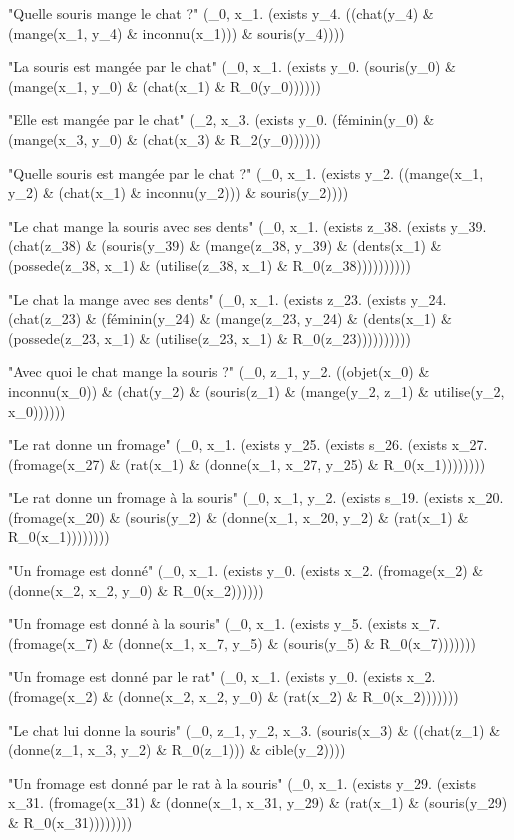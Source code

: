 \documentclass[12pt]{article}
\theoremstyle{exostyle}
\begin{document}
\begin{spverbatim}
"Quelle souris mange le chat ?"
 (\y_0, x_1. (exists y_4. ((chat(y_4) & (mange(x_1, y_4) & inconnu(x_1))) & souris(y_4))))

"La souris est mangée par le chat"
 (\R_0, x_1. (exists y_0. (souris(y_0) & (mange(x_1, y_0) & (chat(x_1) & R_0(y_0))))))

"Elle est mangée par le chat"
 (\R_2, x_3. (exists y_0. (féminin(y_0) & (mange(x_3, y_0) & (chat(x_3) & R_2(y_0))))))

"Quelle souris est mangée par le chat ?"
 (\y_0, x_1. (exists y_2. ((mange(x_1, y_2) & (chat(x_1) & inconnu(y_2))) & souris(y_2))))

"Le chat mange la souris avec ses dents"
 (\R_0, x_1. (exists z_38. (exists y_39. (chat(z_38) & (souris(y_39) & (mange(z_38, y_39) & (dents(x_1) & (possede(z_38, x_1) & (utilise(z_38, x_1) & R_0(z_38))))))))))

"Le chat la mange avec ses dents"
 (\R_0, x_1. (exists z_23. (exists y_24. (chat(z_23) & (féminin(y_24) & (mange(z_23, y_24) & (dents(x_1) & (possede(z_23, x_1) & (utilise(z_23, x_1) & R_0(z_23))))))))))

"Avec quoi le chat mange la souris ?"
 (\x_0, z_1, y_2. ((objet(x_0) & inconnu(x_0)) & (chat(y_2) & (souris(z_1) & (mange(y_2, z_1) & utilise(y_2, x_0))))))

"Le rat donne un fromage"
 (\R_0, x_1. (exists y_25. (exists s_26. (exists x_27. (fromage(x_27) & (rat(x_1) & (donne(x_1, x_27, y_25) & R_0(x_1))))))))

"Le rat donne un fromage à la souris"
 (\R_0, x_1, y_2. (exists s_19. (exists x_20. (fromage(x_20) & (souris(y_2) & (donne(x_1, x_20, y_2) & (rat(x_1) & R_0(x_1))))))))

"Un fromage est donné"
 (\R_0, x_1. (exists y_0. (exists x_2. (fromage(x_2) & (donne(x_2, x_2, y_0) & R_0(x_2))))))

"Un fromage est donné à la souris"
 (\R_0, x_1. (exists y_5. (exists x_7. (fromage(x_7) & (donne(x_1, x_7, y_5) & (souris(y_5) & R_0(x_7)))))))

"Un fromage est donné par le rat"
 (\R_0, x_1. (exists y_0. (exists x_2. (fromage(x_2) & (donne(x_2, x_2, y_0) & (rat(x_2) & R_0(x_2)))))))

"Le chat lui donne la souris"
 (\R_0, z_1, y_2, x_3. (souris(x_3) & ((chat(z_1) & (donne(z_1, x_3, y_2) & R_0(z_1))) & cible(y_2))))

"Un fromage est donné par le rat à la souris"
 (\R_0, x_1. (exists y_29. (exists x_31. (fromage(x_31) & (donne(x_1, x_31, y_29) & (rat(x_1) & (souris(y_29) & R_0(x_31))))))))


\end{spverbatim}
\end{document}
